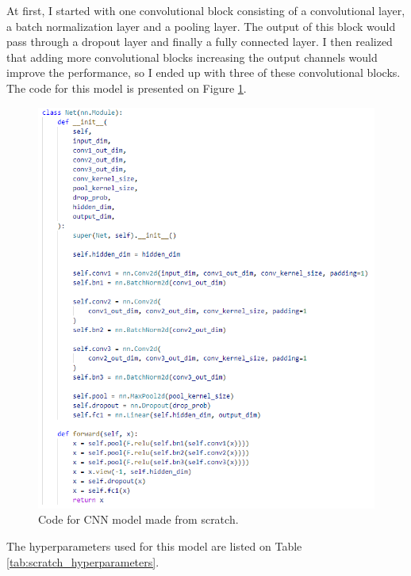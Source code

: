 \documentclass{article}
\begin{document}
    At first, I started with one convolutional block consisting of a convolutional layer, a batch normalization layer and a pooling layer. The output of this block would pass through a dropout layer and finally a fully connected layer. I then realized that adding more convolutional blocks increasing the output channels would improve the performance, so I ended up with three of these convolutional blocks. The code for this model is presented on Figure \ref{fig:model_scratch}.

    \begin{figure}[htbp]
        \centering
        \includegraphics[width=\linewidth]{img/model_scratch.png}
        \caption{Code for CNN model made from scratch.}
        \label{fig:model_scratch}
    \end{figure}

    The hyperparameters used for this model are listed on Table \ref{tab:scratch_hyperparameters}.
\end{document}
